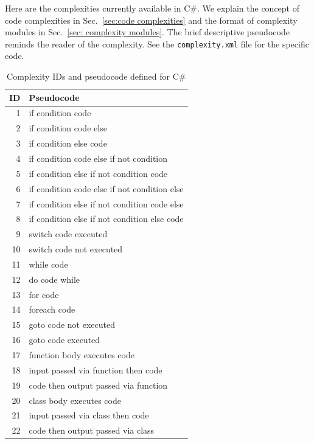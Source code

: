 \documentclass[12pt]{article}
\newcommand{\CSharp}{C{\fontseries{b}\selectfont\#}}
\begin{document}
\newpage

Here are the complexities currently available in \CSharp.
We explain the concept of code complexities in Sec.~\ref{sec:code complexities} and
the format of complexity modules in Sec.~\ref{sec: complexity modules}.
The brief descriptive pseudocode reminds the reader of the complexity.
See the \verb|complexity.xml| file for the specific code.

\begin{table}[H]
\centering
\caption{Complexity IDs and pseudocode defined for \CSharp}
\begin{tabular}{|r|l|}
\hline
\textbf{ID} & \textbf{Pseudocode} \\
\hline
 1 & if condition code \\
\hline
 2 & if condition code else \\
\hline
 3 & if condition else code \\
\hline
 4 & if condition code else if not condition \\
\hline
 5 & if condition else if not condition code \\
\hline
 6 & if condition code else if not condition else \\
\hline
 7 & if condition else if not condition code else \\
 \hline
 8 & if condition else if not condition else code \\
\hline
 9 & switch code executed \\
\hline
10 & switch code not executed \\
\hline
11 & while code \\
\hline

12 & do code while \\
\hline
13 & for code \\
\hline
14 & foreach code \\
\hline
15 & goto code not executed \\
\hline
16 & goto code executed \\
\hline
17 & function body executes code \\
\hline
18 & input passed via function then code \\
\hline
19 & code then output passed via function \\
\hline
20 & class body executes code \\
\hline
21 & input passed via class then code \\
\hline
22 & code then output passed via class \\
\hline
\end{tabular}
\label{tab:complexity IDs for CSharp}
\end{table}
\end{document}
